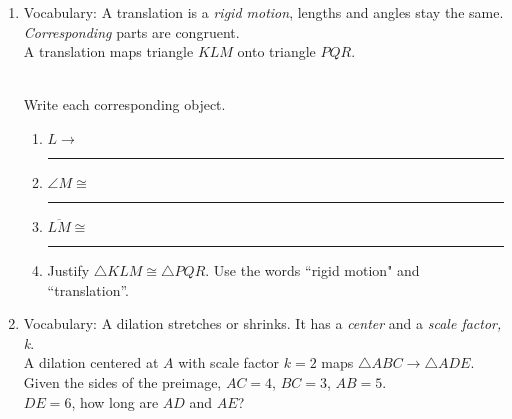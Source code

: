 \documentclass[12pt, twoside]{article}
\begin{document}
\begin{enumerate}
\newpage
\item Vocabulary: A translation is a \emph{rigid motion}, lengths and angles stay the same. \emph{Corresponding} parts are congruent. \\[0.5cm]
A translation maps triangle $KLM$ onto triangle $PQR$. \vspace{0.5cm}
    \begin{multicols}{2}
      \\
      Write each corresponding object.
      \begin{enumerate}
        \item $L \rightarrow$ \rule{2cm}{0.15mm}
        \item $\angle M \cong$ \rule{2cm}{0.15mm}
        \item $\overline {LM} \cong$ \rule{2cm}{0.15mm}
        \item Justify $\triangle KLM \cong \triangle PQR$. Use the words ``rigid motion" and ``translation''.
      \end{enumerate}
    \end{multicols}

\newpage
\item Vocabulary: A dilation stretches or shrinks. It has a \emph{center} and a \emph{scale factor, k}. \\[0.5cm]
A dilation centered at $A$ with scale factor $k=2$ maps $\triangle ABC \rightarrow \triangle ADE$. Given the sides of the preimage, $AC = 4$, $BC = 3$, $AB = 5$. \\[0.5cm]
$DE = 6$, how long are $AD$ and $AE$?
    \begin{flushright}
    \end{flushright}


\end{enumerate}
\end{document}
